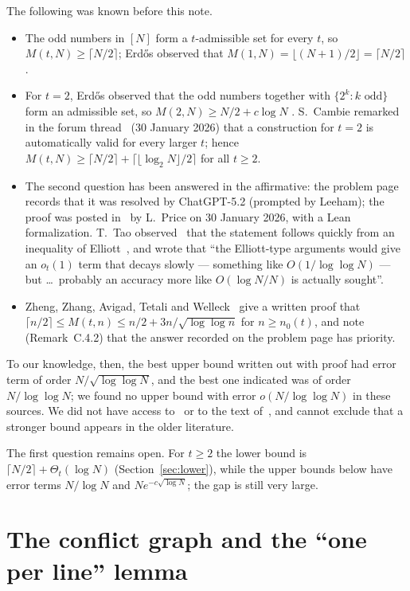\documentclass[11pt]{amsart}
\theoremstyle{definition}
\theoremstyle{remark}
\begin{document}
The following was known before this note.
\begin{itemize}
\item The odd numbers in $[N]$ form a $t$-admissible set for every $t$, so $M(t,N)\ge\lceil N/2\rceil$; Erd\H{o}s observed that $M(1,N)=\lfloor (N+1)/2\rfloor=\lceil N/2\rceil$ \cite{EP635}.
\item For $t=2$, Erd\H{o}s observed that the odd numbers together with $\{2^k:k\text{ odd}\}$ form an admissible set, so $M(2,N)\ge N/2+c\log N$ \cite{EP635}. S.~Cambie remarked in the forum thread~\cite{Forum} (30 January 2026) that a construction for $t=2$ is automatically valid for every larger $t$; hence $M(t,N)\ge\lceil N/2\rceil+\lceil\lfloor\log_2N\rfloor/2\rceil$ for all $t\ge2$.
\item The second question has been answered in the affirmative: the problem page~\cite{EP635} records that it was resolved by ChatGPT-5.2 (prompted by Leeham); the proof was posted in~\cite{Forum} by L.~Price on 30 January 2026, with a Lean formalization. T.~Tao observed~\cite{Forum} that the statement follows quickly from an inequality of Elliott~\cite[Lemma~4.7]{El79}, and wrote that ``the Elliott-type arguments would give an $o_t(1)$ term that decays slowly --- something like $O(1/\log\log N)$ --- but \dots\ probably an accuracy more like $O(\log N/N)$ is actually sought''.
\item Zheng, Zhang, Avigad, Tetali and Welleck~\cite[Appendix~C.4, Theorem~C.4.1]{ZZATW} give a written proof that $\lceil n/2\rceil\le M(t,n)\le n/2+3n/\sqrt{\log\log n}$ for $n\ge n_0(t)$, and note (Remark~C.4.2) that the answer recorded on the problem page has priority.
\end{itemize}
To our knowledge, then, the best upper bound written out with proof had error term of order $N/\sqrt{\log\log N}$, and the best one indicated was of order $N/\log\log N$; we found no upper bound with error $o(N/\log\log N)$ in these sources. We did not have access to~\cite{Gu83,Ru99} or to the text of~\cite{El79}, and cannot exclude that a stronger bound appears in the older literature.

The first question remains open. For $t\ge2$ the lower bound is $\lceil N/2\rceil+\Theta_t(\log N)$ (Section~\ref{sec:lower}), while the upper bounds below have error terms $N/\log N$ and $N e^{-c\sqrt{\log N}}$; the gap is still very large.

\section{The conflict graph and the ``one per line'' lemma}
\end{document}
